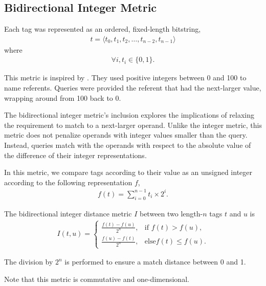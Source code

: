 \subsection{Bidirectional Integer Metric} \label{sec:integerbimetric}

Each tag was represented as an ordered, fixed-length bitstring,
\begin{align*}
t = \langle t_0, t_1, t_2, \dots, t_{n-2}, t_{n-1} \rangle
\end{align*}
where
\begin{align*}
\forall i, t_i \in \{0, 1\}.
\end{align*}

This metric is inspired by \citep{spector2011tag}.
They used positive integers between 0 and 100 to name referents.
Queries were provided the referent that had the next-larger value, wrapping around from 100 back to 0.

The bidirectional integer metric's inclusion explores the implications of relaxing the requirement to match to a next-larger operand.
Unlike the integer metric, this metric does not penalize operands with integer values smaller than the query.
Instead, queries match with the operands with respect to the absolute value of the difference of their integer representations.

In this metric, we compare tags according to their value as an unsigned integer according to the following representation $f$,
\begin{align*}
f(t)
= \sum_{i=0}^{n-1} t_i \times 2^i.
\end{align*}

The bidirectional integer distance metric $I$ between two length-$n$ tags $t$ and $u$ is
\begin{align*}
I(t, u) =
\begin{cases}
  \frac{f(t) - f(u)}{2^n}, & \text{if } f(t) > f(u), \\
  \frac{f(u) - f(t)}{2^n}, & \text{else} f(t) \leq f(u).
\end{cases}
\end{align*}

The division by $2^n$ is performed to ensure a match distance between 0 and 1.

Note that this metric is commutative and one-dimensional.
